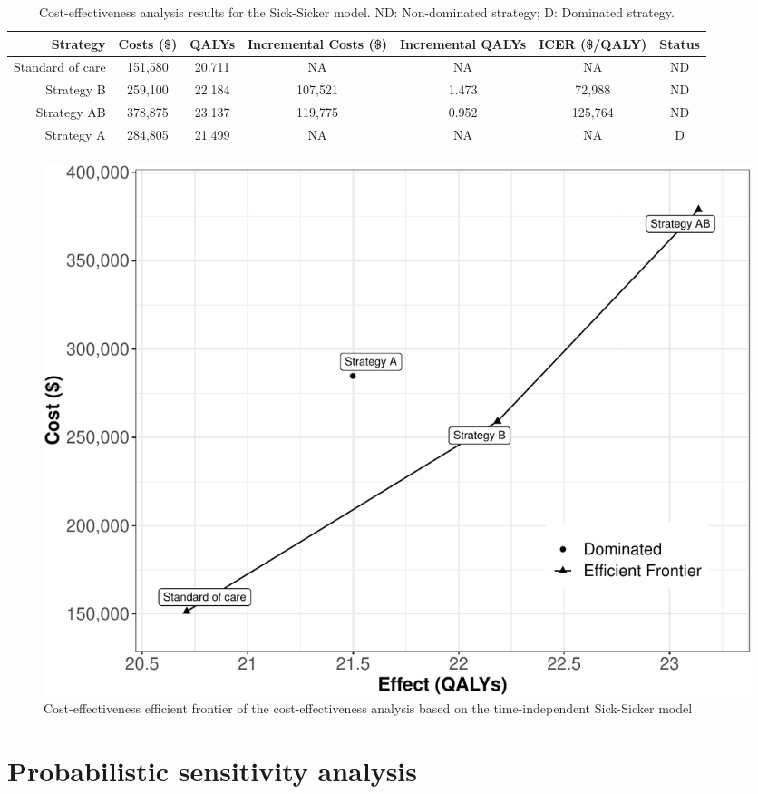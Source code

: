 \documentclass[
]{article}
\begin{document}
\begin{table}[!h]

\caption{\label{tab:table-cea}Cost-effectiveness analysis results for the Sick-Sicker model. ND: Non-dominated strategy; D: Dominated strategy.}
\centering
\begin{tabular}[t]{rcccccc}
\toprule{}
Strategy & Costs (\$) & QALYs & Incremental Costs (\$) & Incremental QALYs & ICER (\$/QALY) & Status\\
\midrule{}
Standard of care & 151,580 & 20.711 & NA & NA & NA & ND\\
Strategy B & 259,100 & 22.184 & 107,521 & 1.473 & 72,988 & ND\\
Strategy AB & 378,875 & 23.137 & 119,775 & 0.952 & 125,764 & ND\\
Strategy A & 284,805 & 21.499 & NA & NA & NA & D\\
\bottomrule{}
\end{tabular}
\end{table}

\begin{figure}[H]

{\centering \includegraphics{figs/Sick-Sicker-CEA-1} 

}

\caption{Cost-effectiveness efficient frontier of the cost-effectiveness analysis based on the time-independent Sick-Sicker model}\label{fig:Sick-Sicker-CEA}
\end{figure}

\hypertarget{probabilistic-sensitivity-analysis}{%
\section{Probabilistic sensitivity analysis}\label{probabilistic-sensitivity-analysis}}
\end{document}

